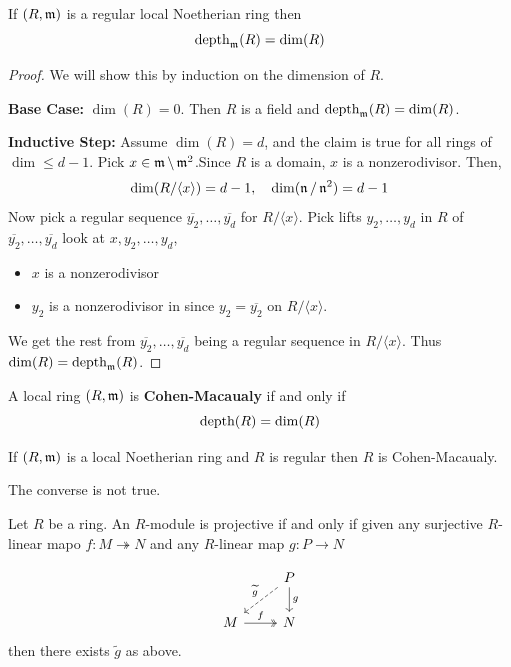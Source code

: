 \documentclass[12pt]{amsart}
\begin{document}
\begin{theorem}
    If $(R, \operatorname{\mathfrak{m}})$ is a regular local Noetherian ring then 
    \[\operatorname{\text{depth}}_{\operatorname{\mathfrak{m}}}(R) = \dim(R)\]
\end{theorem}

\begin{proof}
    We will show this by induction on the dimension of $R$. 

    \textbf{Base Case:} $\dim(R) = 0$. Then $R$ is a field and $\operatorname{\text{depth}}_{\operatorname{\mathfrak{m}}}(R) = \dim(R)$. 
    
    \textbf{Inductive Step:} Assume $\dim(R) = d$, and the claim is true for all rings of $\dim \leq d-1$. Pick $x \in \operatorname{\mathfrak{m}} \setminus \operatorname{\mathfrak{m}}^2$.Since $R$ is a domain, $x$ is a nonzerodivisor. Then, 
    \[\dim(R/\langle x \rangle) = d - 1, \quad \dim(\operatorname{\mathfrak{n}}/\operatorname{\mathfrak{n}}^2) = d - 1\]
    Now pick a regular sequence $\overline{y_2}, \ldots, \overline{y_d}$ for $R/\langle x \rangle$. Pick lifts $y_2, \ldots, y_d$ in $R$ of $\overline{y_2}, \ldots, \overline{y_d}$ look at $x, y_2, \ldots, y_d$, 
    \begin{itemize}
        \item $x$ is a nonzerodivisor
        \item $y_2$ is a nonzerodivisor in since $y_2 = \overline{y_2}$ on $R/\langle x \rangle$. 
    \end{itemize}
    We get the rest from $\overline{y_2}, \ldots, \overline{y_d}$ being a regular sequence in $R/\langle x \rangle$. Thus $\dim(R) = \operatorname{\text{depth}}_{\operatorname{\mathfrak{m}}}(R)$. 
\end{proof}

\begin{definition}
    A local ring $(R, \operatorname{\mathfrak{m}})$ is \textbf{Cohen-Macaualy} if and only if 
    \[\operatorname{\text{depth}}(R) = \dim(R)\]
\end{definition}

\begin{corollary}
    If $(R, \operatorname{\mathfrak{m}})$ is a local Noetherian ring and $R$ is regular then $R$ is Cohen-Macaualy. 

    The converse is not true. 
\end{corollary}

\begin{definition}
    Let $R$ be a ring. An $R$-module is projective if and only if given any surjective $R$-linear mapo $f: M \twoheadrightarrow N$ and any $R$-linear map $g: P \to N$

    \[\begin{tikzcd}
        {} & P \arrow[d, "g"] \ar[dl, dashed, "\widetilde{g}", swap] \\ 
        M \ar[r, two heads, "f"] & N
    \end{tikzcd}\]
    then there exists $\widetilde{g}$ as above. 
\end{definition}
\end{document}
